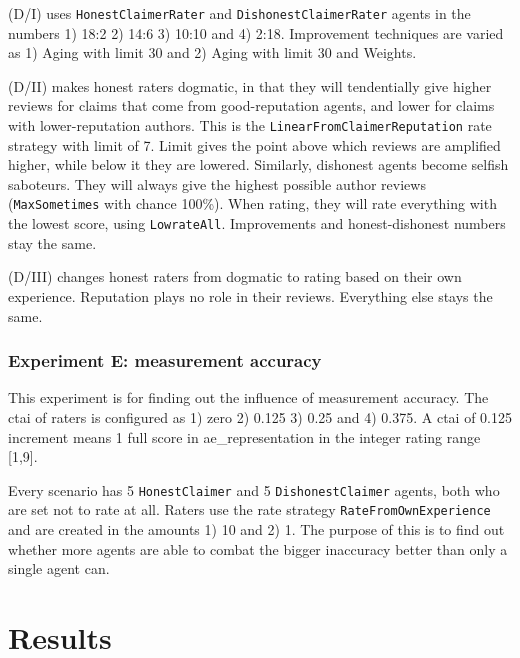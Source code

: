 \documentclass[%
    ]{\PathToTumTemplate/thesis/tum_thesis}
\begin{document}
(D/I) uses \texttt{HonestClaimerRater} and \texttt{DishonestClaimerRater} agents in the numbers 1) 18:2 2) 14:6 3) 10:10 and 4) 2:18. Improvement techniques are varied as 1) Aging with limit 30 and 2) Aging with limit 30 and Weights.

(D/II) makes honest raters dogmatic, in that they will tendentially give higher reviews for claims that come from good-reputation agents, and lower for claims with lower-reputation authors. 
This is the \texttt{LinearFromClaimerReputation} rate strategy with limit of 7. 
Limit gives the point above which reviews are amplified higher, while below it they are lowered.
Similarly, dishonest agents become selfish saboteurs. 
They will always give the highest possible author reviews (\texttt{MaxSometimes} with chance 100\%).
When rating, they will rate everything with the lowest score, using \texttt{LowrateAll}.
Improvements and honest-dishonest numbers stay the same.

(D/III) changes honest raters from dogmatic to rating based on their own experience.
Reputation plays no role in their reviews. 
Everything else stays the same.

\subsubsection{Experiment E: measurement accuracy}
This experiment is for finding out the influence of measurement accuracy.
The \gls{ctai} of raters is configured as 1) zero 2) 0.125 3) 0.25 and 4) 0.375.
A \gls{ctai} of 0.125 increment means 1 full score in \gls{ae_representation} in the integer rating range [1,9].

Every scenario has 5 \texttt{HonestClaimer} and 5 \texttt{DishonestClaimer} agents, both who are set not to rate at all.
Raters use the rate strategy \texttt{RateFromOwnExperience} and are created in the amounts 1) 10 and 2) 1.
The purpose of this is to find out whether more agents are able to combat the bigger inaccuracy better than only a single agent can.



\section{Results}\label{sec:results}
\end{document}
